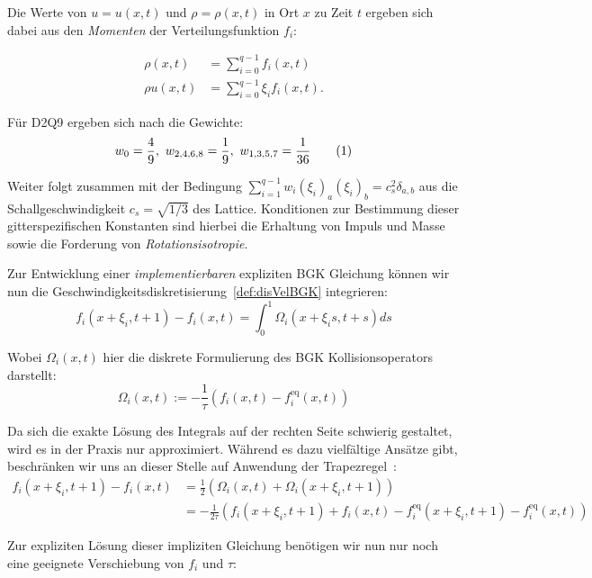 Die Werte von \(u = u(x,t)\) und \(\rho = \rho(x,t)\) in Ort \(x\) zu Zeit \(t\) ergeben sich dabei aus den \emph{Momenten} der Verteilungsfunktion \(f_i\):

\begin{Definition}
\label{def:Momente}
\begin{align*}
\rho(x,t) &= \sum_{i=0}^{q-1} f_i(x,t) \\
\rho u(x,t) &= \sum_{i=0}^{q-1} \xi_i f_i(x,t).
\end{align*}
\end{Definition}

Für D2Q9 ergeben sich nach \cite[Gl.~3.60 bzw. Tabelle~3.3]{Krueger17} die Gewichte:
\[w_0 = \frac{4}{9}, \ w_{2,4,6,8} = \frac{1}{9}, \ w_{1,3,5,7} = \frac{1}{36} \numberthis\label{eq:Weight}\]

Weiter folgt zusammen mit der Bedingung \(\sum_{i=1}^{q-1} w_i (\xi_i)_a (\xi_i)_b = c_s^2 \delta_{a,b}\) aus \cite[Gl.~3.60]{Krueger17} die Schallgeschwindigkeit \(c_s = \sqrt{1/3}\) des Lattice. Konditionen zur Bestimmung dieser gitterspezifischen Konstanten sind hierbei die Erhaltung von Impuls und Masse sowie die Forderung von \emph{Rotationsisotropie}.

Zur Entwicklung einer \emph{implementierbaren} expliziten BGK Gleichung können wir nun die Geschwindigkeitsdiskretisierung~\ref{def:disVelBGK} integrieren:
\[ f_i(x+\xi_i, t+1) - f_i(x,t) = \int_0^1 \Omega_i(x+\xi_i s,t+s) ds \]

Wobei \(\Omega_i(x,t)\) hier die diskrete Formulierung des BGK Kollisionsoperators darstellt:
\[\Omega_i(x,t) := -\frac{1}{\tau} ( f_i(x,t) - f_i^\text{eq}(x, t) )\]

Da sich die exakte Lösung des Integrals auf der rechten Seite schwierig gestaltet, wird es in der Praxis nur approximiert. Während es dazu vielfältige Ansätze gibt, beschränken wir uns an dieser Stelle auf Anwendung der Trapezregel~\cite[Kap.~6]{AmannEscherII}:
\begin{align*}
f_i(x+\xi_i,t+1) - f_i(x,t) &= \frac{1}{2} \left( \Omega_i(x,t) + \Omega_i(x+\xi_i,t+1) \right) \\
&= -\frac{1}{2\tau} \left( f_i(x+\xi_i,t+1) + f_i(x,t) - f_i^\text{eq}(x+\xi_i,t+1) - f_i^\text{eq}(x,t) \right)
\end{align*}

Zur expliziten Lösung dieser impliziten Gleichung benötigen wir nun nur noch eine geeignete Verschiebung von \(f_i\) und \(\tau\):

